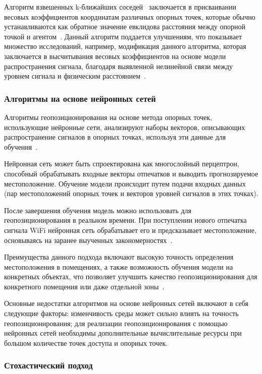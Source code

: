 Алгоритм взвешенных k-ближайших соседей~\cite{gansemer2010improved} заключается в присваивании весовых коэффициентов координатам различных опорных точек, которые обычно устанавливаются как обратное значение евклидова расстояния между опорной точкой и агентом~\cite{wknn}. Данный алгоритм поддается улучшениям, что показывает множество исследований, например, модификация данного алгоритма, которая заключается в высчитывания весовых коэффициентов на основе модели распространения сигнала, благодаря выявленной нелинейной связи между уровнем сигнала и физическим расстоянием~\cite{mwknn}.

\subsubsection{Алгоритмы на основе нейронных сетей}

Алгоритмы геопозиционирования на основе метода опорных точек, использующие нейронные сети, анализируют наборы векторов, описывающих распространение сигналов в опорных точках, используя эти данные для обучения~\cite{neural-networks}. 

Нейронная сеть может быть спроектирована как многослойный перцептрон, способный обрабатывать входные векторы отпечатков и выводить прогнозируемое местоположение. Обучение модели происходит путем подачи входных данных (пар местоположений опорных точек и векторов уровней сигналов в этих точках).

После завершения обучения модель можно использовать для геопозиционирования в реальном времени. При поступлении нового отпечатка сигнала WiFi нейронная сеть обрабатывает его и предсказывает местоположение, основываясь на заранее выученных закономерностях~\cite{trends}.

Преимущества данного подхода включают высокую точность определения местоположения в помещениях, а также возможность обучения модели на конкретных объектах, что позволяет улучшить качество геопозиционирования для конкретного помещения или даже отдельной зоны~\cite{neural-networks}.

Основные недостатки алгоритмов на основе нейронных сетей включают в себя следующие факторы: изменчивость среды может сильно влиять на точность геопозиционирования; для реализации геопозиционирования с помощью нейронных сетей необходимы дополнительные вычислительные ресурсы при большом количестве точек доступа и опорных точек.

\subsubsection{Стохастический подход}


